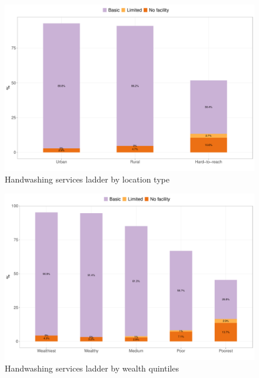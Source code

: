 \documentclass[12pt,a4paper]{article}
\begin{document}
\newpage

\begin{figure}[H]

{\centering \includegraphics{kayahReport_files/figure-latex/handwashing1plot-1} 

}

\caption{Handwashing services ladder by location type}\label{fig:handwashing1plot}
\end{figure}

\begin{figure}[H]

{\centering \includegraphics{kayahReport_files/figure-latex/handwashing2plot-1} 

}

\caption{Handwashing services ladder by wealth quintiles}\label{fig:handwashing2plot}
\end{figure}
\end{document}
